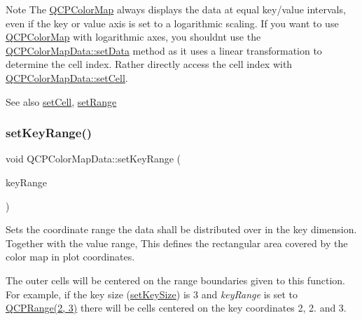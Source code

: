 \begin{DoxyNote}{Note}
The \hyperlink{class_q_c_p_color_map}{Q\+C\+P\+Color\+Map} always displays the data at equal key/value intervals, even if the key or value axis is set to a logarithmic scaling. If you want to use \hyperlink{class_q_c_p_color_map}{Q\+C\+P\+Color\+Map} with logarithmic axes, you shouldn\textquotesingle{}t use the \hyperlink{class_q_c_p_color_map_data_afd2083ccfd6987ec94aa7ef8e91ca39a}{Q\+C\+P\+Color\+Map\+Data\+::set\+Data} method as it uses a linear transformation to determine the cell index. Rather directly access the cell index with \hyperlink{class_q_c_p_color_map_data_a8e75eaf8746596319032a93f3d2d0683}{Q\+C\+P\+Color\+Map\+Data\+::set\+Cell}.
\end{DoxyNote}
\begin{DoxySeeAlso}{See also}
\hyperlink{class_q_c_p_color_map_data_a8e75eaf8746596319032a93f3d2d0683}{set\+Cell}, \hyperlink{class_q_c_p_color_map_data_aad9c1c7c703c1339489fc730517c83d4}{set\+Range} 
\end{DoxySeeAlso}
\mbox{\label{class_q_c_p_color_map_data_a0738c485f3c9df9ea1241b7a8bb6a86e}} 
\subsubsection{\texorpdfstring{set\+Key\+Range()}{setKeyRange()}}
{\footnotesize\ttfamily void Q\+C\+P\+Color\+Map\+Data\+::set\+Key\+Range (\begin{DoxyParamCaption}\item[{const \hyperlink{class_q_c_p_range}{Q\+C\+P\+Range} \&}]{key\+Range }\end{DoxyParamCaption})}

Sets the coordinate range the data shall be distributed over in the key dimension. Together with the value range, This defines the rectangular area covered by the color map in plot coordinates.

The outer cells will be centered on the range boundaries given to this function. For example, if the key size (\hyperlink{class_q_c_p_color_map_data_ac7ef70e383aface34b44dbde49234b6b}{set\+Key\+Size}) is 3 and {\itshape key\+Range} is set to {\ttfamily \hyperlink{class_q_c_p_range}{Q\+C\+P\+Range(2, 3)}} there will be cells centered on the key coordinates 2, 2. and 3.

